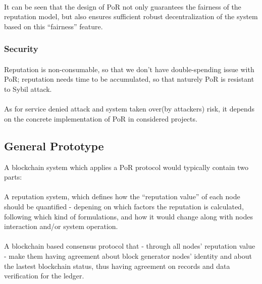 \documentclass[]{article}
\begin{document}
\begin{CJK*}{UTF8}{gbsn}
\paragraph{} It can be seen that the design of PoR not only guarantees the fairness of the reputation model, but also ensures sufficient robust decentralization of the system based on this ``fairness'' feature.
\subsubsection*{Security}
\paragraph{} Reputation is non-consumable, so that we don't have double-spending issue with PoR; reputation needs time to be accumulated, so that naturely PoR is resistant to Sybil attack.
\paragraph{} As for service denied attack and system taken over(by attackers) risk, it depends on the concrete implementation of PoR in considered projects. 

\subsection{General Prototype}
A blockchain system which applies a PoR protocol would typically contain two parts:
\paragraph{}
  A reputation system, which defines how the ``reputation value'' of each node should be quantified - depening on which factors the reputation is calculated, following which kind of formulations, and how it would change along with nodes interaction and/or system operation.
\paragraph{}
 A blockchain based consensus protocol that - through all nodes' reputation value - make them having agreement about block generator nodes' identity and about the lastest blockchain status, thus having agreement on records and data verification for the ledger.  

\end{CJK*}
\end{document}
